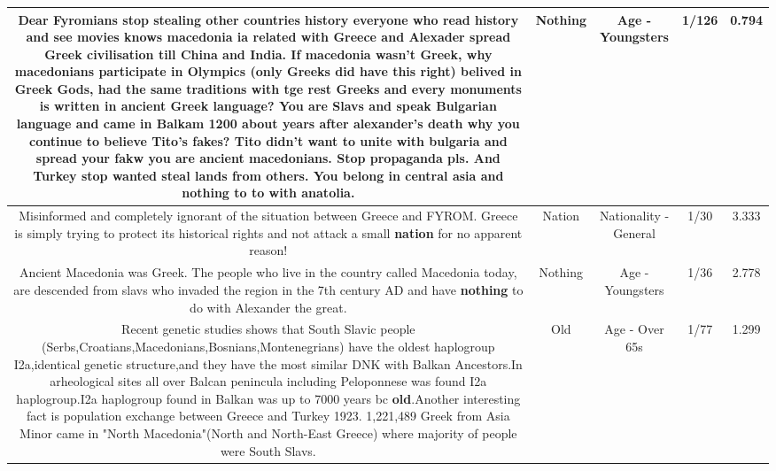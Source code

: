 \documentclass[11pt]{article}
\newlength\mylength
\begin{document}
\begin{center}
\begin{longtable}{|C{.65\mylength}|C{.30\mylength}|C{.12\mylength}|C{.12\mylength}|C{.12\mylength}|}
  \small Dear Fyromians stop stealing other countries history everyone who read history and see movies knows macedonia ia related with Greece and Alexader spread Greek civilisation till China and India. If macedonia wasn't Greek, why macedonians  participate in Olympics (only Greeks did have this right) belived in Greek Gods, had the same traditions with tge rest Greeks and every monuments is written in ancient Greek language? You are Slavs and speak Bulgarian language and came in Balkam 1200 about years after alexander's death why you continue to believe Tito's fakes? Tito didn't want to unite with bulgaria and spread your fakw you are ancient macedonians. Stop propaganda pls. And Turkey stop wanted steal lands from others. You belong in central asia and \textbf{nothing} to to with anatolia.\normalsize   & Nothing & Age - Youngsters & 1/126 & 0.794 \\  \hline
  \small Misinformed and completely ignorant of the situation between Greece and FYROM. Greece is simply trying to protect its historical rights and not attack a small \textbf{nation} for no apparent reason!\normalsize   & Nation & Nationality - General & 1/30 & 3.333 \\  \hline
  \small Ancient Macedonia was Greek. The people who live in the country called Macedonia today, are descended from slavs who invaded the region in the 7th century AD and have \textbf{nothing} to do with Alexander the great.\normalsize   & Nothing & Age - Youngsters & 1/36 & 2.778 \\  \hline
  \small Recent genetic studies shows that  South Slavic people (Serbs,Croatians,Macedonians,Bosnians,Montenegrians) have the oldest haplogroup I2a,identical genetic structure,and they have the most similar DNK with Balkan Ancestors.In arheological sites all over Balcan penincula including Peloponnese was found I2a haplogroup.I2a haplogroup found in Balkan was up to 7000 years bc \textbf{old}.Another interesting fact is population exchange between Greece and Turkey 1923. 1,221,489 Greek from Asia Minor came in "North Macedonia"(North and North-East Greece) where majority of people were  South Slavs.\normalsize   & Old & Age - Over 65s & 1/77 & 1.299 \\  \hline

\end{longtable}
\end{center}
\end{document}
